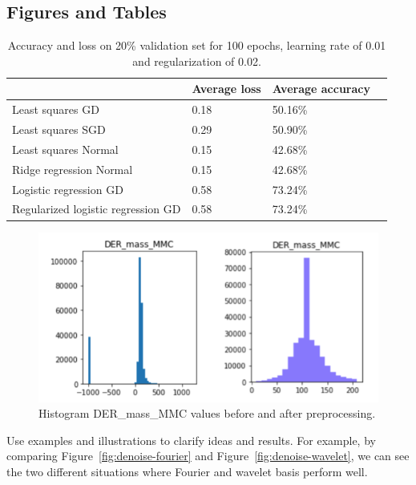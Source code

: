\documentclass[10pt,conference,compsocconf]{IEEEtran}
\begin{document}
\subsection{Figures and Tables}
\begin{table}[htbp]
  \centering
  \begin{tabular}[c]{|l||l|l|l|}
    \hline
    &Average loss&Average accuracy \\
    \hline
    Least squares GD & 0.18 & 50.16\% \\
    Least squares SGD & 0.29 & 50.90\%\\
    Least squares Normal & 0.15 & 42.68\%\\
    Ridge regression Normal & 0.15 & 42.68\%\\
    Logistic regression GD & 0.58 & 73.24\%\\
    Regularized logistic regression GD & 0.58 & 73.24\% \\
    \hline
  \end{tabular}
  \caption{Accuracy and loss on 20\% validation set for 100 epochs, learning rate of 0.01 and regularization of 0.02. }
  \label{tab:basic_training}
\end{table}
\begin{figure}[tbp]
  \centering
  \includegraphics[width=\columnwidth]{processing_compare}
  \caption{Histogram DER\_mass\_MMC values before and after preprocessing.}
  \vspace{-3mm}
  \label{fig:processing_compare}
\end{figure}

Use examples and illustrations to clarify ideas and results. For
example, by comparing Figure~\ref{fig:denoise-fourier} and
Figure~\ref{fig:denoise-wavelet}, we can see the two different
situations where Fourier and wavelet basis perform well. 







\end{document}
